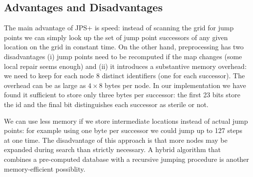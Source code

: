 \subsection*{Advantages and Disadvantages}
The main advantage of JPS+ is speed: instead of scanning the grid for
jump points we can simply look up the set of jump point successors
of any given location on the grid in constant time.
On the other hand, preprocessing has two disadvantages (i) jump points need to be recomputed
if the map changes (some local repair seems enough) and (ii) it introduces 
a substantive memory overhead: we need to keep for each node 8 distinct 
identifiers (one for each successor). 
The overhead can be as large as $4\times8$ bytes per node. In our
implementation we have found it sufficient to store only three bytes 
per successor: the first 23 bits store the id and the final bit distinguishes
each successor as sterile or not. 
\par
We can use less memory if we
store intermediate locations instead of actual jump points: for example
using one byte per successor we could jump up to 127 steps 
at one time. The disadvantage of this approach is that more nodes may be 
expanded during search than strictly necessary. A hybrid 
algorithm that combines a pre-computed database with a recursive
jumping procedure is another memory-efficient possiblity.
